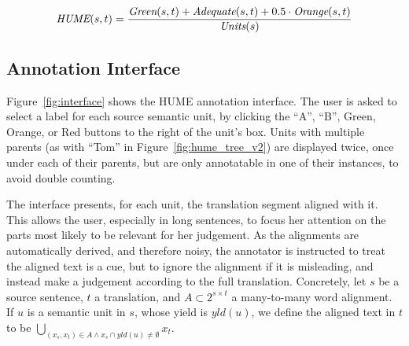 \documentclass[11pt,letterpaper]{article}
\newcommand{\figref}[1]{Figure~\ref{#1}}
\def\func#1{\text{\it #1}}  %
\def\HUME{\func{HUME}}
\def\Adequate{\func{Adequate}}
\def\Green{\func{Green}}
\def\Orange{\func{Orange}}
\def\Units{\func{Units}}
\begin{document}
\vspace{-.5cm}
{\scriptsize
\begin{equation}
  \HUME(s,t) = \frac{\Green(s,t) + \Adequate(s,t) + 0.5\cdot \Orange(s,t)}{\Units(s)}
  \nonumber
\end{equation}
}
\vspace{-.5cm}


\subsection{Annotation Interface}

\figref{fig:interface} shows the HUME annotation interface.
The user is asked to select a label for each source semantic unit,
by clicking the ``A'', ``B'', Green, Orange, or Red buttons to the right of the unit's box.
Units with multiple parents (as with ``Tom'' in \figref{fig:hume_tree_v2}) are displayed
twice, once under each of their parents, but are only annotatable in one of
their instances, to avoid double counting.

The interface presents, for each unit, the translation segment aligned with it.
This allows the user, especially in long sentences, to focus her attention on the parts
most likely to be relevant for her judgement. As the alignments are automatically derived,
and therefore noisy, the annotator is instructed to treat the aligned text is a cue, but to ignore
the alignment if it is misleading, and instead 
make a judgement according to the full translation.
Concretely, let $s$ be a source sentence, $t$ a translation,
and $A \subset 2^{s \times t}$ a many-to-many word alignment.
If $u$ is a semantic unit in $s$, whose yield is $yld(u)$, we define the aligned text in
$t$ to be $\bigcup_{(x_s,x_t) \in A \wedge x_s \cap yld(u) \neq \emptyset} x_t$.
\end{document}
